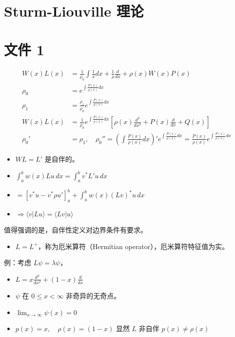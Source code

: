 \section{Sturm-Liouville 理论}
\label{sec:sturm_liouville}



\section*{文件 1}

\begin{align*}
W(x)L(x) &= \frac{1}{\rho_0} \int \frac{1}{x} dx + \frac{1}{\rho} \frac{d}{dx} + \rho(x) W(x) P(x) \\
\rho_0 &= e^{\int \frac{P(x)}{\rho(x)} dx} \\
\rho_1 &= \frac{\rho_1}{\rho_0} e^{\int \frac{P(x)}{\rho(x)} dx} \\
W(x)L(x) &= \frac{1}{\rho_0} e^{\int \frac{P(x)}{\rho(x)} dx} \left[ \rho(x) \frac{d^2}{dx^2} + P(x) \frac{d}{dx} + Q(x) \right] \\
\rho_0' &= \rho_1, \quad \rho_0'' = \left( \int \frac{P(x)}{\rho(x)} dx \right)' e^{\int \frac{P(x)}{\rho(x)} dx} = \frac{P(x)}{\rho(x)} e^{\int \frac{P(x)}{\rho(x)} dx}
\end{align*}

\begin{itemize}
    \item $WL = L'$ 是自伴的。
    \item $\int_a^b w(x) L u \, dx = \int_a^b v^* L' u \, dx$
    \item $= \left[ v^* u - v^* \rho u' \right]_a^b + \int_a^b w(x) (Lv)^* u \, dx$
    \item $\Rightarrow \langle v | L u \rangle = \langle L v | u \rangle$
\end{itemize}

值得强调的是，自伴性定义对边界条件有要求。

\begin{itemize}
    \item $L = L^+$，称为厄米算符（Hermitian operator），厄米算符特征值为实。
\end{itemize}

例：考虑 $L \psi = \lambda \psi$，
\begin{itemize}
    \item $L = x \frac{d^2}{dx^2} + (1-x) \frac{d}{dx}$
    \item $\psi$ 在 $0 \leq x < \infty$ 非奇异的无奇点。
    \item $\lim_{x \to \infty} \psi(x) = 0$
    \item $p(x) = x, \quad \rho(x) = (1-x)$ 显然 $L$ 非自伴 $p(x) \neq \rho(x)$
\end{itemize}


